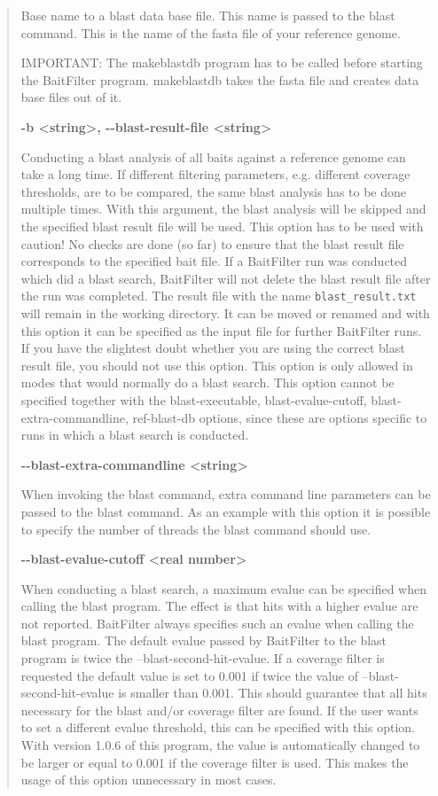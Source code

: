 \documentclass[a4paper,pdflatex,11pt]{article}
\begin{document}
\begin{quote}
Base name to a blast data base file. This name is passed to the blast
command. This is the name of the fasta file of your reference genome.

IMPORTANT: The makeblastdb program has to be called before starting the
BaitFilter program. makeblastdb takes the fasta file and creates data
base files out of it.

\textbf{ -b \textless string\textgreater, -\/-blast-result-file \textless string\textgreater }

Conducting a blast analysis of all baits against a reference genome can take a long time.
If different filtering parameters, e.g. different coverage thresholds, are to be compared, the
same blast analysis has to be done multiple times. With this argument, the
blast analysis will be skipped and the specified blast result file will be
used. This option has to be used with caution! No checks are done (so
far) to ensure that the blast result file corresponds to the specified
bait file. If a BaitFilter run was conducted which did a blast search,
BaitFilter will not delete the blast result file after the run was
completed. The result file with the name \verb+blast_result.txt+ will remain
in the working directory. It can be moved or renamed and with this option
it can be specified as the input file for further BaitFilter runs. If
you have the slightest doubt whether you are using the correct blast
result file, you should not use this option. This option is only
allowed in modes that would normally do a blast search. This option
cannot be specified together with the blast-executable,
blast-evalue-cutoff, blast-extra-commandline, ref-blast-db options,
since these are options specific to runs in which a blast search is
conducted.


\textbf{-\/-blast-extra-commandline \textless string\textgreater }

When invoking the blast command, extra command line parameters can be
passed to the blast command. As an example with this option it is
possible to specify the number of threads the blast command should use.

\textbf{-\/-blast-evalue-cutoff \textless real number\textgreater }

When conducting a blast search, a maximum evalue can be specified when
calling the blast program. The effect is that hits with a higher
evalue are not reported. BaitFilter always specifies such an evalue
when calling the blast program. The default evalue passed by
BaitFilter to the blast program is twice the
--blast-second-hit-evalue. If a coverage filter is requested the
default value is set to 0.001 if twice the value of
--blast-second-hit-evalue is smaller than 0.001. This should guarantee
that all hits necessary for the blast and/or coverage filter are
found. If the user wants to set a different evalue threshold, this can
be specified with this option. With version 1.0.6 of this program, the
value is automatically changed to be larger or equal to 0.001 if the
coverage filter is used. This makes the usage of this option unnecessary
in most cases.


\end{quote}
\end{document}
